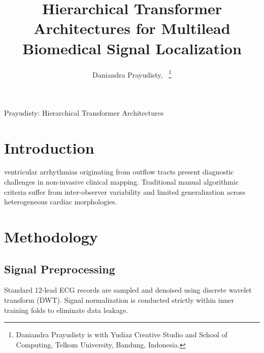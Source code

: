 \documentclass[10pt,journal,compsoc]{IEEEtran}
\begin{document}
\title{Hierarchical Transformer Architectures for Multilead Biomedical Signal Localization}

\author{Daniandra Prayudisty,~
\thanks{Daniandra Prayudisty is with Yudiaz Creative Studio and School of Computing, Telkom University, Bandung, Indonesia.}
}

%
{Prayudisty: Hierarchical Transformer Architectures}


\maketitle
\IEEEdisplaynontitleabstractindextext
\IEEEpeerreviewmaketitle

\section{Introduction}
 ventricular arrhythmias originating from outflow tracts present diagnostic challenges in non-invasive clinical mapping. Traditional manual algorithmic criteria suffer from inter-observer variability and limited generalization across heterogeneous cardiac morphologies.

\section{Methodology}
\subsection{Signal Preprocessing}
Standard 12-lead ECG records are sampled and denoised using discrete wavelet transform (DWT). Signal normalization is conducted strictly within inner training folds to eliminate data leakage.
\end{document}
